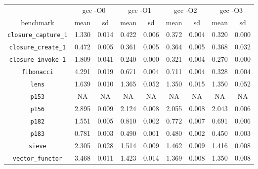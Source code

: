 \documentclass[12pt,a4paper,twoside,openright]{report}
\begin{document}
\begin{figure}[h]
\begin{tabular}{| c | c c | c c | c c | c c |}
  \hline
  & \multicolumn{2}{c|}{gcc -O0}
  & \multicolumn{2}{c|}{gcc -O1}
  & \multicolumn{2}{c|}{gcc -O2}
  & \multicolumn{2}{c|}{gcc -O3}
  \\
benchmark                     & mean  & sd    & mean  & sd    & mean  & sd    & mean  & sd    \\
  \hline
\lstinline!closure_capture_1! & \cellcolor[hsb]{0.3,0.266,1}1.330 & 0.014 & \cellcolor[hsb]{0.3,0.767,1}0.422 & 0.006 & \cellcolor[hsb]{0.3,0.795,1}0.372 & 0.004 & \cellcolor[hsb]{0.3,0.823,1}0.320 & 0.000 \\
\lstinline!closure_create_1!  & \cellcolor[hsb]{0.0,0.975,1}0.472 & 0.005 & \cellcolor[hsb]{0.0,0.628,1}0.361 & 0.005 & \cellcolor[hsb]{0.0,0.635,1}0.364 & 0.005 & \cellcolor[hsb]{0.0,0.648,1}0.368 & 0.032 \\
\lstinline!closure_invoke_1!  & \cellcolor[hsb]{0.3,0.175,1}1.809 & 0.041 & \cellcolor[hsb]{0.3,0.890,1}0.240 & 0.000 & \cellcolor[hsb]{0.3,0.854,1}0.321 & 0.004 & \cellcolor[hsb]{0.3,0.877,1}0.270 & 0.000 \\
\lstinline!fibonacci!         & \cellcolor[hsb]{0.0,0.178,1}4.291 & 0.019 & \cellcolor[hsb]{0.3,0.788,1}0.671 & 0.004 & \cellcolor[hsb]{0.3,0.775,1}0.711 & 0.004 & \cellcolor[hsb]{0.3,0.896,1}0.328 & 0.004 \\
\lstinline!lens!              & \cellcolor[hsb]{0.0,1.000,1}1.639 & 0.010 & \cellcolor[hsb]{0.0,1.000,1}1.365 & 0.052 & \cellcolor[hsb]{0.0,1.000,1}1.350 & 0.015 & \cellcolor[hsb]{0.0,1.000,1}1.350 & 0.052 \\
\lstinline!p153!              &                                NA &    NA &                                NA &    NA &                                NA &    NA &                                NA &    NA \\
\lstinline!p156!              & \cellcolor[hsb]{0.0,0.913,1}2.895 & 0.009 & \cellcolor[hsb]{0.0,0.536,1}2.124 & 0.008 & \cellcolor[hsb]{0.0,0.503,1}2.055 & 0.008 & \cellcolor[hsb]{0.0,0.497,1}2.043 & 0.006 \\
\lstinline!p182!              & \cellcolor[hsb]{0.0,0.198,1}1.551 & 0.005 & \cellcolor[hsb]{0.3,0.271,1}0.810 & 0.002 & \cellcolor[hsb]{0.3,0.305,1}0.772 & 0.007 & \cellcolor[hsb]{0.3,0.378,1}0.691 & 0.006 \\
\lstinline!p183!              & \cellcolor[hsb]{0.0,0.377,1}0.781 & 0.003 & \cellcolor[hsb]{0.0,0.051,1}0.490 & 0.001 & \cellcolor[hsb]{0.0,0.040,1}0.480 & 0.002 & \cellcolor[hsb]{0.0,0.006,1}0.450 & 0.003 \\
\lstinline!sieve!             & \cellcolor[hsb]{0.3,0.166,1}2.305 & 0.028 & \cellcolor[hsb]{0.3,0.452,1}1.514 & 0.009 & \cellcolor[hsb]{0.3,0.471,1}1.462 & 0.009 & \cellcolor[hsb]{0.3,0.487,1}1.416 & 0.008 \\
\lstinline!vector_functor!    & \cellcolor[hsb]{0.3,0.422,1}3.468 & 0.011 & \cellcolor[hsb]{0.3,0.763,1}1.423 & 0.014 & \cellcolor[hsb]{0.3,0.772,1}1.369 & 0.008 & \cellcolor[hsb]{0.3,0.775,1}1.350 & 0.008 \\
\hline
\end{tabular}


\end{figure}
\end{document}

